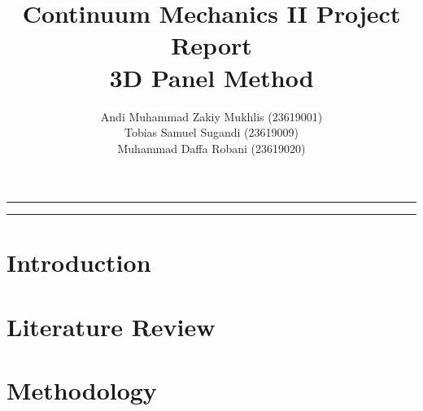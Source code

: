 \documentclass{article}
\begin{document}
\title{Continuum Mechanics II Project Report\\ 3D Panel Method \\}
\author{\small Andi Muhammad Zakiy Mukhlis (23619001) \\ Tobias Samuel Sugandi (23619009) \\ Muhammad Daffa Robani (23619020)}
\date{}
\affil{}
\maketitle

\hrule
\begin{abstract}

\end{abstract}
\hrule

\section{Introduction}

\section{Literature Review}

\section{Methodology}
\end{document}
